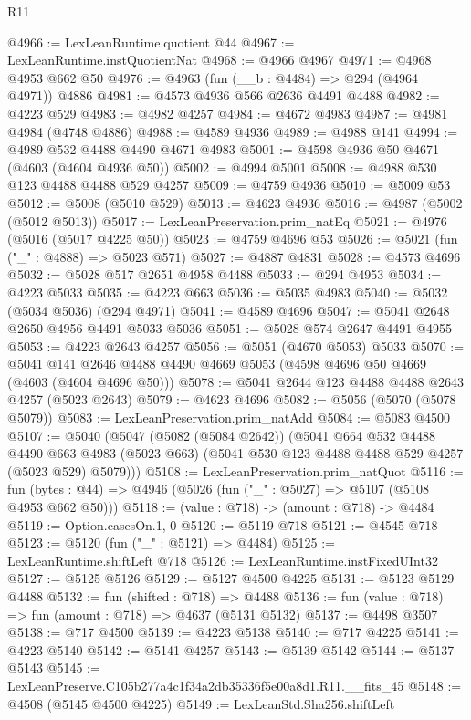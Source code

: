 \begin{lexlean}{R11}
\begin{coremodule}
@4966 := LexLeanRuntime.quotient @44
@4967 := LexLeanRuntime.instQuotientNat
@4968 := @4966 @4967
@4971 := @4968 @4953 @662 @50
@4976 := @4963 (fun (__b : @4484) => @294 (@4964 @4971)) @4886
@4981 := @4573 @4936 @566 @2636 @4491 @4488
@4982 := @4223 @529
@4983 := @4982 @4257
@4984 := @4672 @4983
@4987 := @4981 @4984 (@4748 @4886)
@4988 := @4589 @4936
@4989 := @4988 @141
@4994 := @4989 @532 @4488 @4490 @4671 @4983
@5001 := @4598 @4936 @50 @4671 (@4603 (@4604 @4936 @50))
@5002 := @4994 @5001
@5008 := @4988 @530 @123 @4488 @4488 @529 @4257
@5009 := @4759 @4936
@5010 := @5009 @53
@5012 := @5008 (@5010 @529)
@5013 := @4623 @4936
@5016 := @4987 (@5002 (@5012 @5013))
@5017 := LexLeanPreservation.prim_natEq
@5021 := @4976 (@5016 (@5017 @4225 @50))
@5023 := @4759 @4696 @53
@5026 := @5021 (fun ("_" : @4888) => @5023 @571)
@5027 := @4887 @4831
@5028 := @4573 @4696
@5032 := @5028 @517 @2651 @4958 @4488
@5033 := @294 @4953
@5034 := @4223 @5033
@5035 := @4223 @663
@5036 := @5035 @4983
@5040 := @5032 (@5034 @5036) (@294 @4971)
@5041 := @4589 @4696
@5047 := @5041 @2648 @2650 @4956 @4491 @5033 @5036
@5051 := @5028 @574 @2647 @4491 @4955
@5053 := @4223 @2643 @4257
@5056 := @5051 (@4670 @5053) @5033
@5070 := @5041 @141 @2646 @4488 @4490 @4669 @5053 (@4598 @4696 @50 @4669 (@4603 (@4604 @4696 @50)))
@5078 := @5041 @2644 @123 @4488 @4488 @2643 @4257 (@5023 @2643)
@5079 := @4623 @4696
@5082 := @5056 (@5070 (@5078 @5079))
@5083 := LexLeanPreservation.prim_natAdd
@5084 := @5083 @4500
@5107 := @5040
    (@5047
      (@5082 (@5084 @2642))
      (@5041
        @664
        @532
        @4488
        @4490
        @663
        @4983
        (@5023 @663)
        (@5041 @530 @123 @4488 @4488 @529 @4257 (@5023 @529) @5079)))
@5108 := LexLeanPreservation.prim_natQuot
@5116 := fun (bytes : @44) => @4946 (@5026 (fun ("_" : @5027) => @5107 (@5108 @4953 @662 @50)))
@5118 := (value : @718) -> (amount : @718) -> @4484
@5119 := Option.casesOn.{1, 0}
@5120 := @5119 @718
@5121 := @4545 @718
@5123 := @5120 (fun ("_" : @5121) => @4484)
@5125 := LexLeanRuntime.shiftLeft @718
@5126 := LexLeanRuntime.instFixedUInt32
@5127 := @5125 @5126
@5129 := @5127 @4500 @4225
@5131 := @5123 @5129 @4488
@5132 := fun (shifted : @718) => @4488
@5136 := fun (value : @718) => fun (amount : @718) => @4637 (@5131 @5132)
@5137 := @4498 @3507
@5138 := @717 @4500
@5139 := @4223 @5138
@5140 := @717 @4225
@5141 := @4223 @5140
@5142 := @5141 @4257
@5143 := @5139 @5142
@5144 := @5137 @5143
@5145 := LexLeanPreserve.C105b277a4c1f34a2db35336f5e00a8d1.R11.__fits_45
@5148 := @4508 (@5145 @4500 @4225)
@5149 := LexLeanStd.Sha256.shiftLeft

\end{coremodule}
\end{lexlean}

